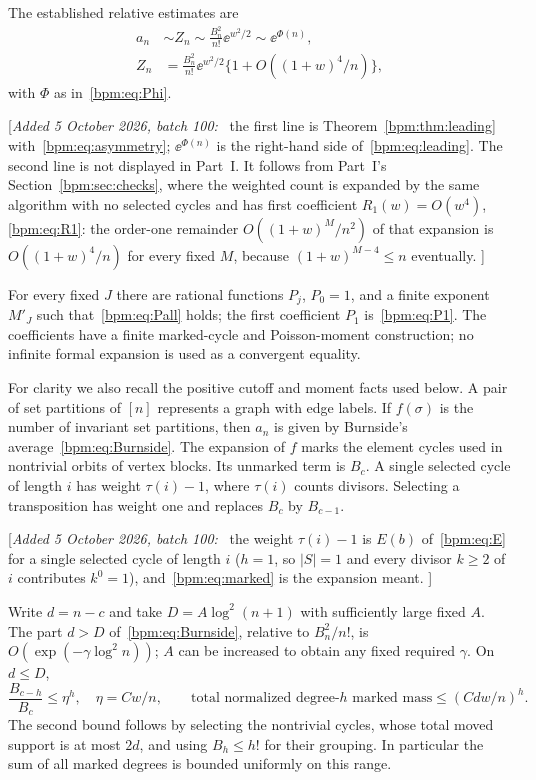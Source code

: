 \documentclass[11pt,a4paper]{article}
\theoremstyle{remark}\newtheorem{remark}[theorem]{Remark}%
\newenvironment{writenote}{\par\smallskip\noindent\small[\textit{Added 5 October 2026, batch 100:}\ }{]\par\smallskip}
\begin{document}
The established relative estimates are
\begin{align}\label{bpm:sym:eq:inputs}
 a_n&\sim Z_n\sim \frac{B_n^2}{n!}\ee^{w^2/2}\sim\ee^{\Phi(n)},\nonumber\\
 Z_n&=\frac{B_n^2}{n!}\ee^{w^2/2}\{1+O((1+w)^4/n)\},
\end{align}
with $\Phi$ as in~\eqref{bpm:eq:Phi}.

\begin{writenote}
the first line is Theorem~\ref{bpm:thm:leading} with~\eqref{bpm:eq:asymmetry};
$\ee^{\Phi(n)}$ is the right-hand side of~\eqref{bpm:eq:leading}. The second
line is not displayed in Part~I. It follows from Part~I's
Section~\ref{bpm:sec:checks}, where the weighted count is expanded by the
same algorithm with no selected cycles and has first coefficient $R_1(w)=O(w^4)$,
\eqref{bpm:eq:R1}: the order-one remainder $O((1+w)^{M}/n^2)$ of that
expansion is $O((1+w)^4/n)$ for every fixed $M$, because $(1+w)^{M-4}\le n$
eventually.
\end{writenote}

For every fixed $J$ there are rational functions $P_j$, $P_0=1$, and a finite exponent $M'_J$ such that~\eqref{bpm:eq:Pall} holds; the first coefficient $P_1$ is~\eqref{bpm:eq:P1}. The coefficients have a finite marked-cycle and Poisson-moment construction; no infinite formal expansion is used as a convergent equality.

For clarity we also recall the positive cutoff and moment facts used below. A pair of set partitions of $[n]$ represents a graph with edge labels. If $f(\sigma)$ is the number of invariant set partitions, then $a_n$ is given by Burnside's average~\eqref{bpm:eq:Burnside}. The expansion of $f$ marks the element cycles used in nontrivial orbits of vertex blocks. Its unmarked term is $B_c$. A single selected cycle of length $i$ has weight $\tau(i)-1$, where $\tau(i)$ counts divisors. Selecting a transposition has weight one and replaces $B_c$ by $B_{c-1}$.

\begin{writenote}
the weight $\tau(i)-1$ is $E(b)$ of~\eqref{bpm:eq:E} for a single selected
cycle of length $i$ ($h=1$, so $|S|=1$ and every divisor $k\ge2$ of $i$
contributes $k^0=1$), and~\eqref{bpm:eq:marked} is the expansion meant.
\end{writenote}

Write $d=n-c$ and take $D=A\log^2(n+1)$ with sufficiently large fixed $A$. The part $d>D$ of~\eqref{bpm:eq:Burnside}, relative to $B_n^2/n!$, is $O(\exp(-\gamma\log^2 n))$; $A$ can be increased to obtain any fixed required $\gamma$. On $d\le D$,
\begin{equation}\label{bpm:sym:eq:markbound}
 \frac{B_{c-h}}{B_c}\le\eta^h,\quad \eta=Cw/n,
 \qquad \text{total normalized degree-$h$ marked mass}\le(Cdw/n)^h.
\end{equation}
The second bound follows by selecting the nontrivial cycles, whose total moved support is at most $2d$, and using $B_h\le h!$ for their grouping. In particular the sum of all marked degrees is bounded uniformly on this range.
\end{document}
